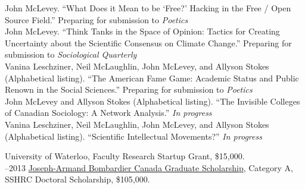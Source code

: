 \documentclass[11pt,usenames,dvipsnames]{article}
\begin{document}


\ind John McLevey. ``What Does it Mean to be `Free?' Hacking in the Free / Open Source Field.'' Preparing for submission to \emph{Poetics} \\

\ind John McLevey. ``Think Tanks in the Space of Opinion: Tactics for Creating Uncertainty about the Scientific Consensus on Climate Change.''  Preparing for submission to \emph{Sociological Quarterly} \\

\ind Vanina Leschziner, Neil McLaughlin, John McLevey, and Allyson Stokes (Alphabetical listing). ``The American Fame Game: Academic Status and Public Renown in the Social Sciences.'' Preparing for submission to \emph{Poetics} \\

\ind John McLevey and Allyson Stokes (Alphabetical listing). ``The Invisible Colleges of Canadian Sociology: A Network Analysis.'' \emph{In progress} \\

\ind Vanina Leschziner, Neil McLaughlin, John McLevey, and Allyson Stokes (Alphabetical listing). ``Scientific Intellectual Movements?'' \emph{In progress} \\ %





 University of Waterloo, Faculty Research Startup Grant, \$15,000. \\

–2013 \href{http://www.sshrc-crsh.gc.ca/funding-financement/programs-programmes/fellowships/doctoral-doctorat-eng.aspx}{Joseph-Armand Bombardier Canada Graduate Scholarship}, Category A, SSHRC Doctoral Scholarship, \$105,000.\\
\end{document}
